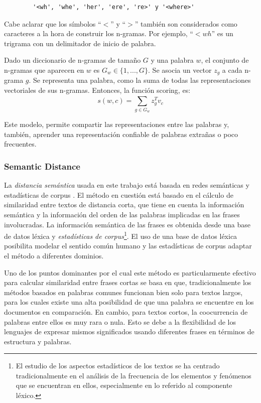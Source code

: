 \begin{center}\ttfamily{}%
	\begin{minipage}{45\wd0}%
		\begin{verbatim}
		'<wh', 'whe', 'her', 'ere', 're>' y '<where>'
		\end{verbatim}
	\end{minipage}
\end{center}

Cabe aclarar que los símbolos ``\(<\)'' y ``\(>\)'' también son considerados como caracteres a la hora de construir los n-gramas. Por ejemplo, ``\(<wh\)'' es un trigrama con un delimitador de inicio de palabra.

\bigskip Dado un diccionario de n-gramas de tamaño \(G\) y una palabra \(w\), el conjunto de n-gramas que aparecen en \(w\) es \(G_w \in \{1,..., G\}\). Se asocia un vector \(z_g\) a cada n-grama \(g\). Se representa una palabra, como la suma de todas las representaciones vectoriales de sus n-gramas. Entonces, la función scoring, es:
\[s(w,c) = \sum_{g \in G_w}^{}{}z_g^T v_c\]

Este modelo, permite compartir las representaciones entre las palabras y, también, aprender una representación confiable de palabras extrañas o poco frecuentes.

\subsubsection{Semantic Distance}
La \textit{distancia semántica} usada en este trabajo está basada en redes semánticas y estadísticas de corpus \citep{li2006sentence}. El método en cuestión está basado en el cálculo de similaridad entre textos de distancia corta, que tiene en cuenta la información semántica y la información del orden de las palabras implicadas en las frases involucradas. La información semántica de las frases es obtenida desde una base de datos léxica y \textit{estadísticas de corpus}\footnote{El estudio de los aspectos estadísticos de los textos se ha centrado tradicionalmente en el análisis de la frecuencia de los elementos y fenómenos que se encuentran en ellos, especialmente en lo referido al componente léxico.}. El uso de una base de datos léxica posibilita modelar el sentido común humano y las estadísticas de corpus adaptar el método a diferentes dominios.

\bigskip Uno de los puntos dominantes por el cual este método es particularmente efectivo para calcular similaridad entre frases cortas se basa en que, tradicionalmente los métodos basados en palabras comunes funcionan bien solo para textos largos, para los cuales existe una alta posibilidad de que una palabra se encuentre en los documentos en comparación. En cambio, para textos cortos, la coocurrencia de palabras entre ellos es muy rara o nula. Esto se debe a la flexibilidad de los lenguajes de expresar mismos significados usando diferentes frases en términos de estructura y palabras.

